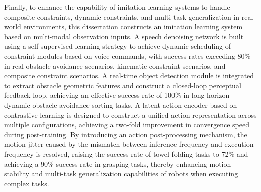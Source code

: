 Finally, to enhance the capability of imitation learning systems to handle composite constraints, dynamic constraints, and multi-task generalization in real-world environments, this dissertation constructs an imitation learning system based on multi-modal observation inputs. A speech denoising network is built using a self-supervised learning strategy to achieve dynamic scheduling of constraint modules based on voice commands, with success rates exceeding 80\% in real obstacle-avoidance scenarios, kinematic constraint scenarios, and composite constraint scenarios. A real-time object detection module is integrated to extract obstacle geometric features and construct a closed-loop perceptual feedback loop, achieving an effective success rate of 100\% in long-horizon dynamic obstacle-avoidance sorting tasks. A latent action encoder based on contrastive learning is designed to construct a unified action representation across multiple configurations, achieving a two-fold improvement in convergence speed during post-training. By introducing an action post-processing mechanism, the motion jitter caused by the mismatch between inference frequency and execution frequency is resolved, raising the success rate of towel-folding tasks to 72\% and achieving a 90\% success rate in grasping tasks, thereby enhancing motion stability and multi-task generalization capabilities of robots when executing complex tasks.

